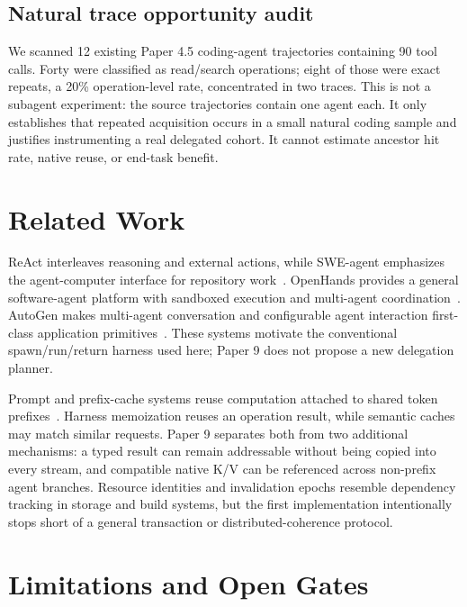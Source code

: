 \documentclass[11pt]{article}
\begin{document}
\subsection{Natural trace opportunity audit}

We scanned 12 existing Paper 4.5 coding-agent trajectories containing 90 tool
calls. Forty were classified as read/search operations; eight of those were
exact repeats, a 20\% operation-level rate, concentrated in two traces. This is
not a subagent experiment: the source trajectories contain one agent each. It
only establishes that repeated acquisition occurs in a small natural coding
sample and justifies instrumenting a real delegated cohort. It cannot estimate
ancestor hit rate, native reuse, or end-task benefit.

\section{Related Work}

ReAct interleaves reasoning and external actions, while SWE-agent emphasizes
the agent-computer interface for repository work~\cite{yao2023react,yang2024sweagent}.
OpenHands provides a general software-agent platform with sandboxed execution
and multi-agent coordination~\cite{wang2024openhands}. AutoGen makes multi-agent
conversation and configurable agent interaction first-class application
primitives~\cite{wu2023autogen}. These systems motivate the conventional
spawn/run/return harness used here; Paper 9 does not propose a new delegation
planner.

Prompt and prefix-cache systems reuse computation attached to shared token
prefixes~\cite{gim2023promptcache,yao2024cacheblend,kwon2023vllm}. Harness
memoization reuses an operation result, while semantic caches may match similar
requests. Paper 9 separates both from two additional mechanisms: a typed result
can remain addressable without being copied into every stream, and compatible
native K/V can be referenced across non-prefix agent branches. Resource
identities and invalidation epochs resemble dependency tracking in storage and
build systems, but the first implementation intentionally stops short of a
general transaction or distributed-coherence protocol.

\section{Limitations and Open Gates}
\end{document}
